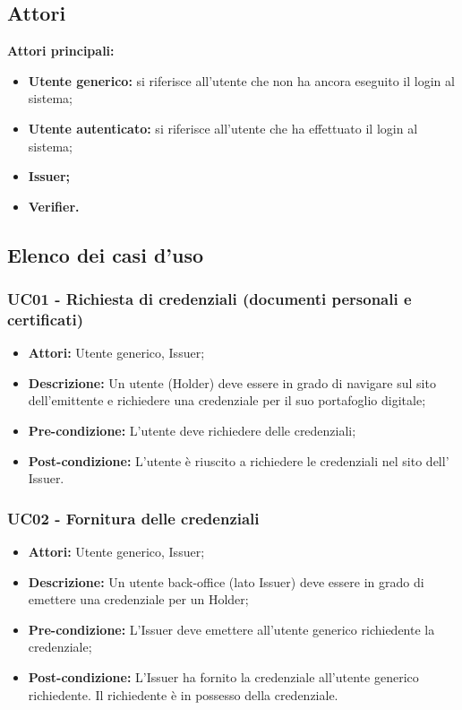 \subsection{Attori}
\textbf{Attori principali:}
\begin{itemize}
    \item\textbf{Utente generico:} si riferisce all’utente che non ha ancora eseguito il login al sistema;
    \item\textbf{Utente autenticato:} si riferisce all’utente che ha effettuato il login al sistema;
    \item\textbf{Issuer;}
    \item\textbf{Verifier.}
\end{itemize}


\subsection{Elenco dei casi d'uso}
\subsubsection{UC01 - Richiesta di credenziali (documenti personali e certificati)}
\begin{itemize}
\item \textbf{Attori:} Utente generico, Issuer;
\item \textbf{Descrizione:} Un utente (Holder) deve essere in grado di navigare sul sito dell'emittente e richiedere una credenziale per il suo portafoglio digitale;
\item \textbf{Pre-condizione:} L’utente deve richiedere delle credenziali;
\item \textbf{Post-condizione:} L’utente è riuscito a richiedere le credenziali nel sito dell’ Issuer.
\end{itemize}

\subsubsection{UC02 - Fornitura delle credenziali}
\begin{itemize}
\item \textbf{Attori:} Utente generico, Issuer;
\item \textbf{Descrizione:} Un utente back-office (lato Issuer) deve essere in grado di emettere una credenziale per un Holder;
\item \textbf{Pre-condizione:} L’Issuer deve emettere all’utente generico richiedente la credenziale;
\item \textbf{Post-condizione:} L’Issuer ha fornito la credenziale all'utente generico richiedente. Il richiedente è in possesso della credenziale.
\end{itemize}

